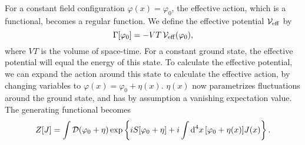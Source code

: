 For a constant field configuration $\varphi(x) = \varphi_0$, the effective action, which is a functional, becomes a regular function.
We define the effective potential $\mathcal{V}_{\mathrm{eff}}$ by
%
\begin{equation}
    \label{definition effective potential}
    \Gamma[\varphi_0] = - V T \, \mathcal{V}_{\mathrm{eff}}(\varphi_0),
\end{equation}
%
where $VT$ is the volume of space-time.
For a constant ground state, the effective potential will equal the energy of this state.
To calculate the effective potential, we can expand the action around this state to calculate the effective action,
by changing variables to $\varphi(x) = \varphi_0 + \eta(x)$.
$\eta(x)$ now parametrizes fluctuations around the ground state, and has by assumption a vanishing expectation value.
The generating functional becomes
%
\begin{align}
    Z[J] 
    = \int \mathcal D (\varphi_0 + \eta) \, 
    \text{exp} \left\{ i S[\varphi_0 + \eta] + i \int \text{d}^4 x\, [\varphi_0 + \eta(x)] J(x)  \right\}.
\end{align}

